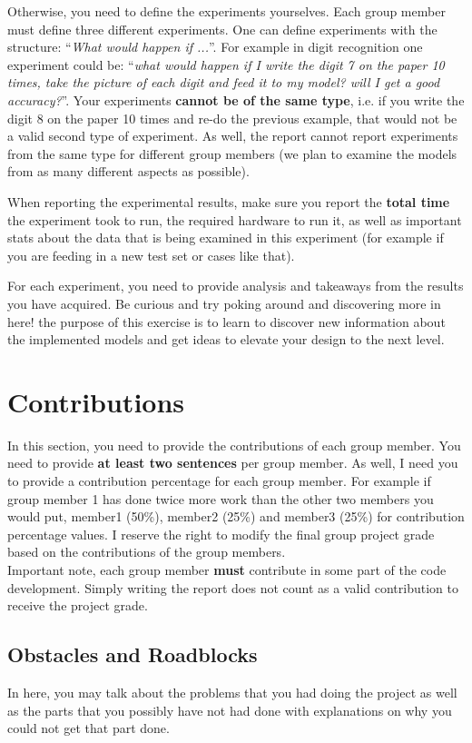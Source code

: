 \documentclass{article}
\begin{document}
Otherwise, you need to define the experiments yourselves. Each group member must define three different experiments. One can define experiments with the structure: ``\textit{What would happen if ...}''. For example in digit recognition one experiment could be: ``\textit{what would happen if I write the digit 7 on the paper 10 times, take the picture of each digit and feed it to my model? will I get a good accuracy?}''. Your experiments \textbf{cannot be of the same type}, i.e. if you write the digit 8 on the paper 10 times and re-do the previous example, that would not be a valid second type of experiment. As well, the report cannot report experiments from the same type for different group members (we plan to examine the models from as many different aspects as possible).

When reporting the experimental results, make sure you report the \textbf{total time} the experiment took to run, the required hardware to run it, as well as important stats about the data that is being examined in this experiment (for example if you are feeding in a new test set or cases like that).

For each experiment, you need to provide analysis and takeaways from the results you have acquired. Be curious and try poking around and discovering more in here! the purpose of this exercise is to learn to discover new information about the implemented models and get ideas to elevate your design to the next level.

\section{Contributions}
In this section, you need to provide the contributions of each group member. You need to provide \textbf{at least two sentences} per group member. As well, I need you to provide a contribution percentage for each group member. For example if group member 1 has done twice more work than the other two members you would put, member1 (50\%), member2 (25\%) and member3 (25\%) for contribution percentage values. I reserve the right to modify the final group project grade based on the contributions of the group members.\\
Important note, each group member \textbf{must} contribute in some part of the code development. Simply writing the report does not count as a valid contribution to receive the project grade.


\subsection{Obstacles and Roadblocks}
In here, you may talk about the problems that you had doing the project as well as the parts that you possibly have not had done with explanations on why you could not get that part done.
\end{document}
